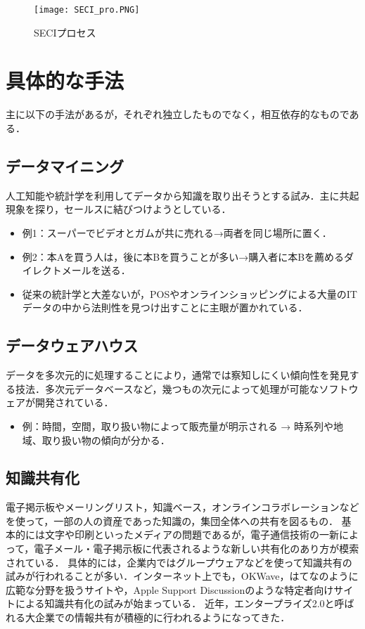 \begin{figure}[H]
\centering
\texttt{[image: SECI\_pro.PNG]}
\caption{SECIプロセス}\label{サンプル図}
\end{figure}


\section{具体的な手法}
主に以下の手法があるが，それぞれ独立したものでなく，相互依存的なものである\cite{management}．
\subsection{データマイニング}
人工知能や統計学を利用してデータから知識を取り出そうとする試み．主に共起現象を探り，セールスに結びつけようとしている．

\begin{itemize}
  \item 例1：スーパーでビデオとガムが共に売れる→両者を同じ場所に置く．
  \item 例2：本Aを買う人は，後に本Bを買うことが多い→購入者に本Bを薦めるダイレクトメールを送る．
  \item 従来の統計学と大差ないが，POSやオンラインショッピングによる大量のITデータの中から法則性を見つけ出すことに主眼が置かれている\cite{management}．
\end{itemize}

\subsection{データウェアハウス}
データを多次元的に処理することにより，通常では察知しにくい傾向性を発見する技法．多次元データベースなど，幾つもの次元によって処理が可能なソフトウェアが開発されている．

\begin{itemize}
  \item 例：時間，空間，取り扱い物によって販売量が明示される → 時系列や地域、取り扱い物の傾向が分かる\cite{management}．
\end{itemize}

\subsection{知識共有化}
電子掲示板やメーリングリスト，知識ベース，オンラインコラボレーションなどを使って，一部の人の資産であった知識の，集団全体への共有を図るもの．
基本的には文字や印刷といったメディアの問題であるが，電子通信技術の一新によって，電子メール・電子掲示板に代表されるような新しい共有化のあり方が模索されている．
具体的には，企業内ではグループウェアなどを使って知識共有の試みが行われることが多い．インターネット上でも，OKWave，はてなのように広範な分野を扱うサイトや，Apple Support Discussionのような特定者向けサイトによる知識共有化の試みが始まっている．
近年，エンタープライズ2.0と呼ばれる大企業での情報共有が積極的に行われるようになってきた\cite{management}．


